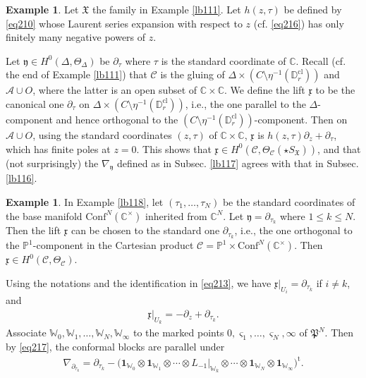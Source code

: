\documentclass[11pt,b5paper,notitlepage]{article}
\theoremstyle{definition}
\newtheorem{eg}[df]{Example}
\theoremstyle{plain}
\newcommand{\fk}{\mathfrak}
\newcommand{\mc}{\mathcal}
\newcommand{\tr}{\mathrm{t}} %
\newcommand{\id}{\mathbf{1}}
\newcommand{\Conf}{\mathrm{Conf}}
\newcommand{\xk}{\mathfrak x}
\newcommand{\yk}{\mathfrak y}
\newcommand{\sgm}{\varsigma}
\newcommand{\SX}{{S_{\fk X}}}
\newcommand{\Wbb}{\mathbb W}
\newcommand{\Cbb}{\mathbb C}
\newcommand{\Pbb}{\mathbb P}
\newcommand{\Dbb}{\mathbb D}
\newcommand{\cl}{\mathrm{cl}}
\numberwithin{equation}{section}
\begin{document}
\begin{eg}\label{lb148}
Let $\fk X$ the family in Example \ref{lb111}. Let $h(z,\tau)$ be defined by \eqref{eq210} whose Laurent series expansion with respect to $z$ (cf. \eqref{eq216}) has only finitely many negative powers of $z$.  

Let $\yk\in H^0(\Delta,\Theta_\Delta)$ be $\partial_\tau$ where $\tau$ is the standard coordinate of $\Cbb$. Recall (cf. the end of Example \ref{lb111}) that $\mc C$ is the gluing of $\Delta\times(C\setminus\eta^{-1}(\Dbb_r^\cl))$ and $\mc A\cup O$, where the latter is an open subset of $\Cbb\times\Cbb$. We define the lift $\xk$ to be the canonical one $\partial_\tau$ on $\Delta\times(C\setminus\eta^{-1}(\Dbb_r^\cl))$, i.e., the one parallel to the $\Delta$-component  and hence orthogonal to the $(C\setminus\eta^{-1}(\Dbb_r^\cl))$-component. Then on $\mc A\cup O$, using the standard coordinates $(z,\tau)$ of $\Cbb\times\Cbb$, $\xk$ is $h(z,\tau)\partial_z+\partial_\tau$, which has finite poles at $z=0$. This shows that $\xk\in H^0(\mc C,\Theta_{\mc C}(\star\SX))$, and that (not surprisingly) the  $\nabla_\yk$ defined as in Subsec. \ref{lb117} agrees with that in Subsec. \ref{lb116}.  \hfill\qedsymbol
\end{eg}



\begin{eg}\label{lb180}
In Example \ref{lb118}, let $(\tau_1,\dots,\tau_N)$ be the standard coordinates of the base manifold $\Conf^N(\Cbb^\times)$ inherited from $\Cbb^N$. Let $\yk=\partial_{\tau_k}$ where $1\leq k\leq N$. Then the lift $\xk$ can be chosen to the standard one $\partial_{\tau_k}$, i.e., the one orthogonal to the $\Pbb^1$-component in the Cartesian product $\mc C=\Pbb^1\times\Conf^N(\Cbb^\times)$. Then $\xk\in H^0(\mc C,\Theta_{\mc C})$.

Using the notations and the identification in \eqref{eq213}, we have $\xk|_{U_i}=\partial_{\tau_k}$ if $i\neq k$, and
\begin{align}
\xk|_{U_k}=-\partial_z+\partial_{\tau_k}.
\end{align}
Associate $\Wbb_0,\Wbb_1,\dots,\Wbb_N,\Wbb_\infty$ to the marked points $0,\sgm_1,\dots,\sgm_N,\infty$ of $\fk P^N$. Then by \eqref{eq217}, the conformal blocks are parallel under
\begin{align}
\nabla_{\partial_{\tau_k}}=\partial_{\tau_k}-\big(\id_{\Wbb_0}\otimes\id_{\Wbb_1}\otimes\cdots\otimes L_{-1}\big|_{\Wbb_k}\otimes\cdots\otimes\id_{\Wbb_N}\otimes\id_{\Wbb_\infty}\big)^\tr.
\end{align}
\end{eg}
\end{document}

